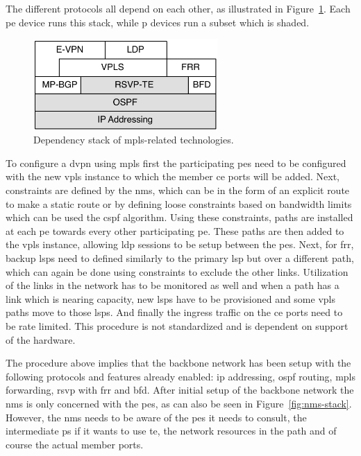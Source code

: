 The different protocols all depend on each other, as illustrated in Figure~\ref{fig:mpls-stack}. Each \ac{pe} device runs this stack, while \ac{p} devices run a subset which is shaded. 

\begin{figure}[!h]
	\centering
	\includegraphics[width=7cm]{./includes/mpls-stack.pdf}
	\caption{Dependency stack of \ac{mpls}-related technologies.}
	\label{fig:mpls-stack}
\end{figure} 

To configure a \ac{dvpn} using \ac{mpls} first the participating \acp{pe} need to be configured with the new \ac{vpls} instance to which the member \ac{ce} ports will be added. Next, constraints are defined by the \ac{nms}, which can be in the form of an explicit route to make a static route or by defining loose constraints based on bandwidth limits which can be used the \ac{cspf} algorithm. Using these constraints, paths are installed at each \ac{pe} towards every other participating \ac{pe}. These paths are then added to the \ac{vpls} instance, allowing \ac{ldp} sessions to be setup between the \acp{pe}. Next, for \ac{frr}, backup \acp{lsp} need to defined similarly to the primary \ac{lsp} but over a different path, which can again be done using constraints to exclude the other links. Utilization of the links in the network has to be monitored as well and when a path has a link which is nearing capacity, new \acp{lsp} have to be provisioned and some \ac{vpls} paths move to those \acp{lsp}. And finally the ingress traffic on the \ac{ce} ports need to be rate limited. This procedure is not standardized and is dependent on support of the hardware.

The procedure above implies that the backbone network has been setup with the following protocols and features already enabled: \ac{ip} addressing, \ac{ospf} routing, \ac{mpls} forwarding, \ac{rsvp} with \ac{frr} and \ac{bfd}. After initial setup of the backbone network the \ac{nms} is only concerned with the \acp{pe}, as can also be seen in Figure~\ref{fig:nms-stack}. However, the \ac{nms} needs to be aware of the \acp{pe} it needs to consult, the intermediate \acp{p} if it wants to use \ac{te}, the network resources in the path and of course the actual member ports.

